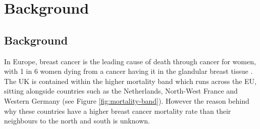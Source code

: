 \chapter{Background}

\section{Background}



In Europe, breast cancer is the leading cause of death through cancer for women, with 1 in 6 women dying from a cancer having it in the glandular breast tissue \cite{European_Commission_2009}. The UK is contained within the higher mortality band which runs across the EU, sitting alongside countries such as the Netherlands, North-West France and Western Germany (see Figure \ref{fig:mortality-band}). However the reason behind why these countries have a higher breast cancer mortality rate than their neighbours to the north and south is unknown.

